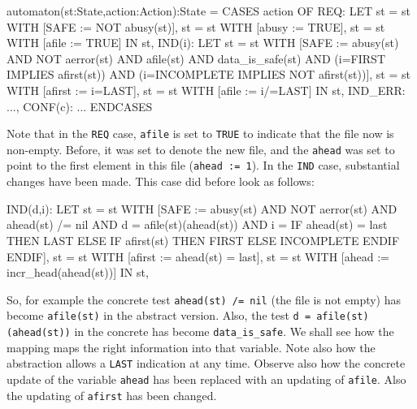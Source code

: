 \begin{smallsession}
  automaton(st:State,action:Action):State =
    CASES action OF
      REQ:
        LET
          st = st WITH [SAFE := NOT abusy(st)],
          st = st WITH [abusy := TRUE],
          st = st WITH [afile := TRUE]
        IN st,
      IND(i):
        LET
          st = st WITH [SAFE :=
            abusy(st) AND NOT aerror(st) AND
            afile(st) AND data_is_safe(st) AND
            (i=FIRST IMPLIES afirst(st)) AND
            (i=INCOMPLETE IMPLIES NOT afirst(st))],
          st = st WITH [afirst := i=LAST],
          st = st WITH [afile  := i/=LAST]
        IN st,
      IND_ERR:
        ...,
      CONF(c):
        ...
    ENDCASES
\end{smallsession}

Note that in the  {\tt REQ} case, {\tt afile}  is set to {\tt TRUE} to
indicate that the file now is non-empty. Before, it  was set to denote
the new  file, and  the {\tt ahead}   was set to  point  to the  first
element in this file ({\tt ahead := 1}). In the {\tt IND} case, substantial
changes have been made. This case did before look as follows:

\begin{smallsession}
  IND(d,i):
    LET
      st = st WITH [SAFE :=
        abusy(st) AND NOT aerror(st) AND
        ahead(st) /= nil AND
        d = afile(st)(ahead(st)) AND
        i = IF ahead(st) = last THEN 
              LAST
            ELSE IF afirst(st) THEN 
                   FIRST
                 ELSE 
                   INCOMPLETE
                 ENDIF
            ENDIF],
      st = st WITH [afirst := ahead(st) = last],
      st = st WITH [ahead  := incr_head(ahead(st))]
    IN st,
\end{smallsession}

So, for example the concrete test {\tt  ahead(st) /= nil} (the file is
not empty) has become  {\tt afile(st)} in  the abstract version. Also,
the test  {\tt d  = afile(st)(ahead(st))}  in  the concrete has become
{\tt data\_is\_safe}.   We  shall see how the  mapping  maps the right
information into that variable. Note also how the abstraction allows a
{\tt LAST}    indication at any  time. Observe   also how the concrete
update of the variable {\tt ahead} has  been replaced with an updating
of {\tt afile}. Also the updating of {\tt afirst} has been changed.\\


\vspace{0.5cm}

